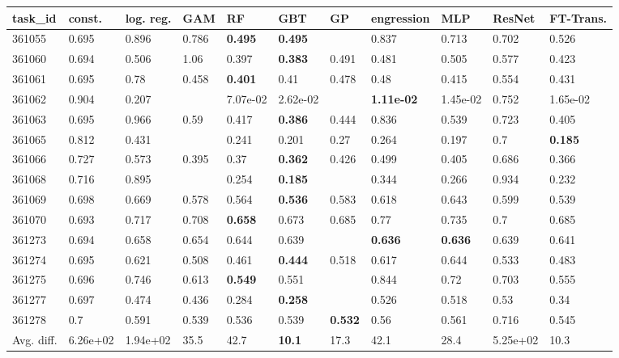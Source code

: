\begin{table}[ht!]
\centering
\begingroup\footnotesize
\begin{tabular}{lllllllllll}
  \hline
\hline
task\_id & const. & log. reg. & GAM & RF & GBT & GP & engression & MLP & ResNet & FT-Trans. \\ 
  \hline
361055 & 0.695 & 0.896 & 0.786 & \textbf{0.495} & \textbf{0.495} &  & 0.837 & 0.713 & 0.702 & 0.526 \\ 
  361060 & 0.694 & 0.506 & 1.06 & 0.397 & \textbf{0.383} & 0.491 & 0.481 & 0.505 & 0.577 & 0.423 \\ 
  361061 & 0.695 & 0.78 & 0.458 & \textbf{0.401} & 0.41 & 0.478 & 0.48 & 0.415 & 0.554 & 0.431 \\ 
  361062 & 0.904 & 0.207 &  & 7.07e-02 & 2.62e-02 &  & \textbf{1.11e-02} & 1.45e-02 & 0.752 & 1.65e-02 \\ 
  361063 & 0.695 & 0.966 & 0.59 & 0.417 & \textbf{0.386} & 0.444 & 0.836 & 0.539 & 0.723 & 0.405 \\ 
  361065 & 0.812 & 0.431 &  & 0.241 & 0.201 & 0.27 & 0.264 & 0.197 & 0.7 & \textbf{0.185} \\ 
  361066 & 0.727 & 0.573 & 0.395 & 0.37 & \textbf{0.362} & 0.426 & 0.499 & 0.405 & 0.686 & 0.366 \\ 
  361068 & 0.716 & 0.895 &  & 0.254 & \textbf{0.185} &  & 0.344 & 0.266 & 0.934 & 0.232 \\ 
  361069 & 0.698 & 0.669 & 0.578 & 0.564 & \textbf{0.536} & 0.583 & 0.618 & 0.643 & 0.599 & 0.539 \\ 
  361070 & 0.693 & 0.717 & 0.708 & \textbf{0.658} & 0.673 & 0.685 & 0.77 & 0.735 & 0.7 & 0.685 \\ 
  361273 & 0.694 & 0.658 & 0.654 & 0.644 & 0.639 &  & \textbf{0.636} & \textbf{0.636} & 0.639 & 0.641 \\ 
  361274 & 0.695 & 0.621 & 0.508 & 0.461 & \textbf{0.444} & 0.518 & 0.617 & 0.644 & 0.533 & 0.483 \\ 
  361275 & 0.696 & 0.746 & 0.613 & \textbf{0.549} & 0.551 &  & 0.844 & 0.72 & 0.703 & 0.555 \\ 
  361277 & 0.697 & 0.474 & 0.436 & 0.284 & \textbf{0.258} &  & 0.526 & 0.518 & 0.53 & 0.34 \\ 
  361278 & 0.7 & 0.591 & 0.539 & 0.536 & 0.539 & \textbf{0.532} & 0.56 & 0.561 & 0.716 & 0.545 \\ 
   \hline
Avg. diff. & 6.26e+02 & 1.94e+02 & 35.5 & 42.7 & \textbf{10.1} & 17.3 & 42.1 & 28.4 & 5.25e+02 & 10.3 \\ 

\end{tabular}
\end{table}
